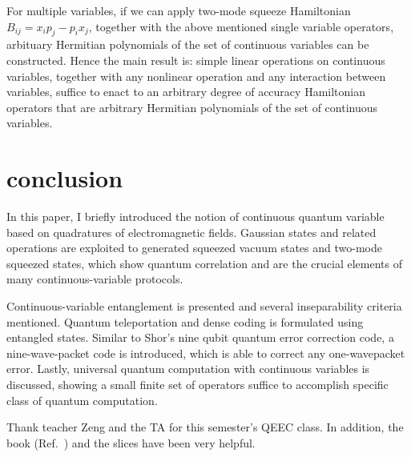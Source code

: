 \documentclass[%
 reprint,
groupedaddress,
showpacs,
 amsmath,amssymb,
 aps,
prb,
]{revtex4-1}
\begin{document}
		For multiple variables, if we can apply two-mode squeeze Hamiltonian $B_{ij} =x_ip_j-p_ix_j $, together with the above mentioned single variable operators, arbituary Hermitian polynomials of the set of continuous variables can be constructed. Hence the main result is: simple linear operations on continuous variables, together with any nonlinear operation and any interaction between variables, suffice to enact to an arbitrary degree of accuracy Hamiltonian operators that are arbitrary Hermitian polynomials of the set of continuous variables.
		
		





\section{conclusion} %
\label{sec:conclusion}
	In this paper, I briefly introduced the notion of continuous quantum variable based on quadratures of electromagnetic fields. Gaussian states and related operations are exploited to generated squeezed vacuum states and two-mode squeezed states, which show quantum correlation and are the crucial elements of many continuous-variable protocols.

	Continuous-variable entanglement is presented and several inseparability criteria mentioned. Quantum teleportation and dense coding is formulated using entangled states. Similar to Shor's nine qubit quantum error correction code, a nine-wave-packet code is introduced, which is able to correct any one-wavepacket error. Lastly, universal quantum computation with continuous variables is discussed, showing a small finite set of operators suffice to accomplish specific class of quantum computation.
	

\begin{acknowledgments}
	Thank teacher Zeng and the TA for this semester's QEEC class. In addition, the book (Ref.~) and the slices have been very helpful.
\end{acknowledgments}

\nocite{*}


\end{document}
